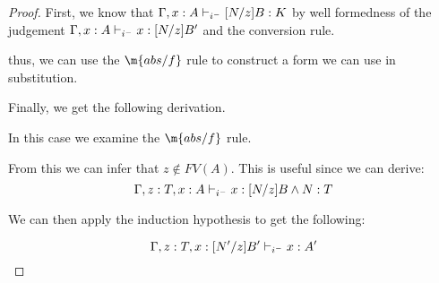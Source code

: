 \begin{proof}
First, we know that $\Gamma,x : A \judgeCI [N/z]B : K$ by well formedness of the judgement 
$\Gamma,x : A \judgeCI x : [N/z]B' $ and the conversion rule.

\begin{prooftree}
\end{prooftree}

thus, we can use the $\m{abs/f}$ rule to construct a form we can use in substitution.

\begin{prooftree}
\end{prooftree}

Finally, we get the following derivation.

\begin{prooftree}
\end{prooftree}

\begin{tcase}
In this case we examine the $\m{abs/f}$ rule.
\end{tcase}

\begin{prooftree}
\end{prooftree}

From this we can infer that $z \notin FV(A)$.  This is useful since we can derive:
\[
\Gamma, z : T, x : A \judgeCI x : [N/z]B \wedge N : T
\]

We can then apply the induction hypothesis to get the following:

\[
\Gamma, z : T, x : [N'/z]B' \judgeCI x : A'
\]


\end{proof}
